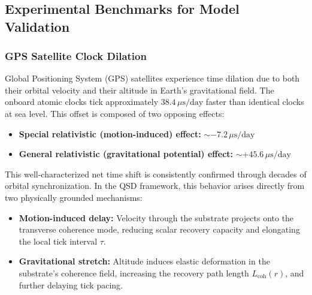 \documentclass[entropy,article,submit,pdftex,moreauthors]{Definitions/mdpi}
\begin{document}
\appendixstart
\appendix
\section[\appendixname~\thesection]{}
\subsection[\appendixname~\thesubsection]{Experimental Benchmarks for Model Validation}
\subsubsection{GPS Satellite Clock Dilation}

Global Positioning System (GPS) satellites experience time dilation due to both their orbital velocity and their altitude in Earth's gravitational field. The onboard atomic clocks tick approximately \( 38.4 \, \mu\text{s/day} \) faster than identical clocks at sea level. This offset is composed of two opposing effects:

\begin{itemize}
  \item \textbf{Special relativistic (motion-induced) effect:} \( \sim -7.2 \, \mu\text{s/day} \)
  \item \textbf{General relativistic (gravitational potential) effect:} \( \sim +45.6 \, \mu\text{s/day} \)
\end{itemize}

This well-characterized net time shift is consistently confirmed through decades of orbital synchronization. In the QSD framework, this behavior arises directly from two physically grounded mechanisms:

\begin{itemize}
  \item \textbf{Motion-induced delay:} Velocity through the substrate projects onto the transverse coherence mode, reducing scalar recovery capacity and elongating the local tick interval \( \tau \).
  \item \textbf{Gravitational stretch:} Altitude induces elastic deformation in the substrate’s coherence field, increasing the recovery path length \( L_{\text{coh}}(r) \), and further delaying tick pacing.
\end{itemize}
\end{document}
